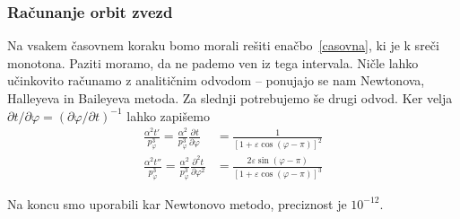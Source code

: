 \documentclass[12pt, a4paper]{article}
\newcommand{\der}[3][]{
    \ensuremath{ \frac{\partial^{#1} #2}{\partial #3^{#1}} }
}
\begin{document}
\subsubsection{Ra\v cunanje orbit zvezd}
Na vsakem \v casovnem koraku bomo morali re\v siti ena\v cbo~\eqref{casovna}, ki je k sre\v ci monotona. Paziti moramo,
da ne pademo ven iz tega intervala. Ni\v cle lahko u\v cinkovito ra\v cunamo z analiti\v cnim odvodom -- ponujajo se
nam Newtonova, Halleyeva in Baileyeva metoda. Za slednji potrebujemo \v se drugi odvod. Ker velja $\partial t/\partial
\varphi = (\partial \varphi/\partial t)^{-1}$ lahko zapi\v semo
\begin{align}
    \frac{\alpha^2 t'}{p_\varphi^3} = \frac{\alpha^2}{p_\varphi^3} \der{t}{\varphi} &= \frac{1}{[1 +
        \varepsilon\cos(\varphi - \pi)]^2} \\
    \frac{\alpha^2 t''}{p_\varphi^3} = \frac{\alpha^2}{p_\varphi^3} \der[2]{t}{\varphi} &=
        \frac{2\varepsilon\sin(\varphi - \pi)}{[1 + \varepsilon\cos(\varphi - \pi)]^3}
\end{align}

Na koncu smo uporabili kar Newtonovo metodo, preciznost je $10^{-12}$.
\end{document}
